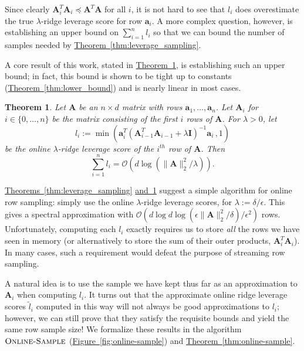 \documentclass[11pt]{article}
\numberwithin{equation}{section}
\newtheorem{theorem}{Theorem}[section]
\theoremstyle{definition}
\theoremstyle{plain}
\newcommand{\expref}[2]{\hyperref[#2]{#1~\ref{#2}}}
\newcommand{\Oh}{\ensuremath{\mathcal{O}}}
\newcommand{\bv}[1]{\mathbf{#1}}
\newcommand{\norm}[1]{\|#1\|}
\begin{document}
Since clearly $\bv{A}_i^T\bv{A}_i \preceq \bv{A}^T\bv{A}$ for all $i$, it is not hard to see that $l_i$ does overestimate the true $\lambda$-ridge leverage score for row $\bv{a}_i$.
A more complex question, however, is establishing an upper bound on $\sum_{i=1}^n l_i$ so that we can bound the number of samples needed by \expref{Theorem}{thm:leverage_sampling}.

A core result of this work, stated in \expref{Theorem}{thm:online_scores}, is establishing such an upper bound; in fact, this bound is shown to be tight up to constants (\expref{Theorem}{thm:lower_bound}) and is nearly linear in most cases.

\begin{theorem}
    \label{thm:online_scores}
    Let $\bv{A}$ be an $n \times d$ matrix with rows $\bv{a}_1, \ldots, \bv{a}_n$.
    Let $\bv{A}_i$ for $i \in \{0, \ldots, n\}$ be the matrix consisting of the first $i$ rows of $\bv{A}$.
For $\lambda > 0$,
let
    $$
        l_i := \min(\bv{a}_i^T (\bv{A}_{i-1}^T \bv{A}_{i-1} + \lambda \bv{I})^{-1} \bv{a}_i\,, 1)
    $$
    be the online $\lambda$-ridge leverage score of the $i^{th}$ row of $\bv{A}$.
    Then
    $$
        \sum_{i=1}^n l_i = \Oh(d \log (\norm{\bv{A}}_2^2/\lambda)).
    $$
\end{theorem}

\expref{Theorems}{thm:leverage_sampling} \expref{and}{thm:online_scores} suggest a simple algorithm for online row sampling: simply use the online $\lambda$-ridge leverage scores, for $\lambda := \delta / \epsilon$.
This gives a spectral approximation with $\Oh(d \log d \log(\epsilon\norm{\bv{A}}_2^2/\delta)/\epsilon^2)$ rows.
Unfortunately, computing each $l_i$ exactly requires us to store \emph{all} the rows we have seen in memory (or alternatively to store the sum of their outer products, $\bv{A}_i^T\bv{A}_i$).
In many cases, such a requirement would defeat the purpose of streaming row sampling.

A natural idea is to use the sample we have kept thus far as an approximation to $\bv{A}_i$ when computing $l_i$.
It turns out that the approximate online ridge leverage scores $\tilde{l}_i$ computed in this way will not always be good approximations to $l_i$; however, we can still prove that they satisfy the requisite bounds and yield the same row sample size!
We formalize these results in the algorithm $\textsc{Online-Sample}$
(\expref{Figure}{fig:online-sample}) and \expref{Theorem}{thm:online-sample}.
\end{document}
